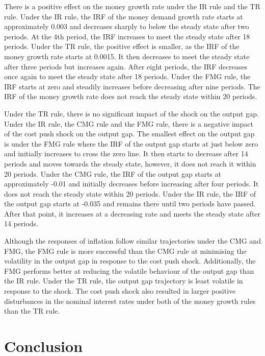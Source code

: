 \documentclass[11pt,preprint, authoryear]{elsarticle}
\numberwithin{equation}{section}
\numberwithin{figure}{section}
\numberwithin{table}{section}
\begin{document}
There is a positive effect on the money growth rate under the IR rule
and the TR rule. Under the IR rule, the IRF of the money demand growth
rate starts at approximately 0.003 and decreases sharply to below the
steady state after two periods. At the 4th period, the IRF increases to
meet the steady state after 18 periods. Under the TR rule, the positive
effect is smaller, as the IRF of the money growth rate starts at 0.0015.
It then decreases to meet the steady state after three periods but
increases again. After eight periods, the IRF decreases once again to
meet the steady state after 18 periods. Under the FMG rule, the IRF
starts at zero and steadily increases before decreasing after nine
periods. The IRF of the money growth rate does not reach the steady
state within 20 periods.

Under the TR rule, there is no significant impact of the shock on the
output gap. Under the IR rule, the CMG rule and the FMG rule, there is a
negative impact of the cost push shock on the output gap. The smallest
effect on the output gap is under the FMG rule where the IRF of the
output gap starts at just below zero and initially increases to cross
the zero line. It then starts to decrease after 14 periods and moves
towards the steady state, however, it does not reach it within 20
periods. Under the CMG rule, the IRF of the output gap starts at
approximately -0.01 and initially decreases before increasing after four
periods. It does not reach the steady state within 20 periods. Under the
IR rule, the IRF of the output gap starts at -0.035 and remains there
until two periods have passed. After that point, it increases at a
decreasing rate and meets the steady state after 14 periods.

Although the responses of inflation follow similar trajectories under
the CMG and FMG, the FMG rule is more successful than the CMG rule at
minimising the volatility in the output gap in response to the cost push
shock. Additionally, the FMG performs better at reducing the volatile
behaviour of the output gap than the IR rule. Under the TR rule, the
output gap trajectory is least volatile in response to the shock. The
cost push shock also resulted in larger positive disturbances in the
nominal interest rates under both of the money growth rules than the TR
rule.

\newpage

\hypertarget{conclusion}{%
\section{Conclusion}\label{conclusion}}
\end{document}
